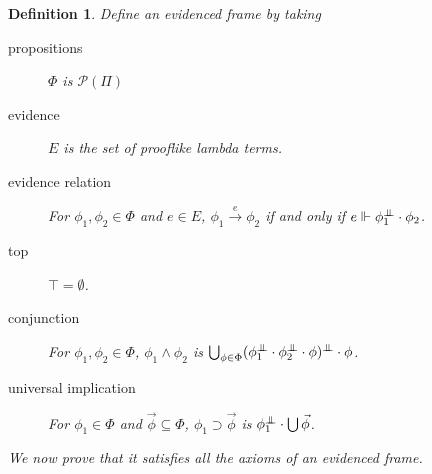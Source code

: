 \documentclass{article}
\newcommand{\pole}{{\bot\mkern-10mu\bot}}
\newcommand{\realizes}{\Vdash}
\newcommand{\powerset}[1]{\mathcal{P}(#1)}
\newtheorem{definition}{Definition}
\begin{document}
\begin{definition}
    Define an evidenced frame by taking
    \begin{description}
        \item[propositions] $\Phi$ is $\powerset{\Pi}$
        \item[evidence] $E$ is the set of prooflike lambda terms.
        \item[evidence relation] For $\phi_1, \phi_2 \in \Phi$ and $e \in E$, $\phi_1 \xrightarrow{e} \phi_2$ if and only if $e \realizes \phi_1^\pole \cdot \phi_2$.
        \item[top] $\top = \emptyset$.
        \item[conjunction] For $\phi_1, \phi_2 \in \Phi$, $\phi_1 \wedge \phi_2$ is $\bigcup_{\phi \in \Phi} (\phi_1^\pole \cdot \phi_2^\pole \cdot \phi)^\pole \cdot \phi$.
        \item[universal implication] For $\phi_1 \in \Phi$ and $\vec\phi \subseteq \Phi$, $\phi_1 \supset \vec\phi$ is $\phi_1^\pole \cdot \bigcup \vec\phi$.
    \end{description}
     
    We now prove that it satisfies all the axioms of an evidenced frame.
\end{definition}
\end{document}

